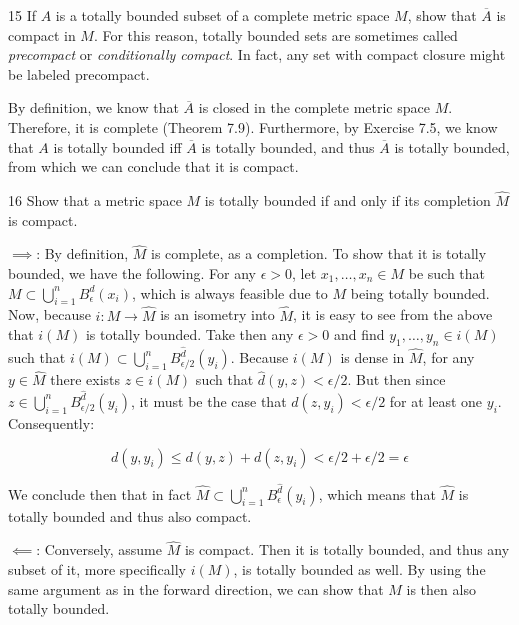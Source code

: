 \begin{exercise}{15}
    If $A$ is a totally bounded subset of a complete metric space $M$, show that $\overline{A}$ is compact in $M$.
    For this reason, totally bounded sets are sometimes called \textit{precompact} or \textit{conditionally compact}.
    In fact, any set with compact closure might be labeled precompact.
\end{exercise}

\begin{solution}
    
    By definition, we know that $\overline{A}$ is closed in the complete metric space $M$.
    Therefore, it is complete (Theorem 7.9).
    Furthermore, by Exercise 7.5, we know that $A$ is totally bounded iff $\overline{A}$ is totally bounded, and thus $\overline{A}$ is totally bounded, from which we can conclude that it is compact.
\end{solution}

\begin{exercise}{16}
    Show that a metric space $M$ is totally bounded if and only if its completion $\hat{M}$ is compact.
\end{exercise}

\begin{solution}

    $\implies$: By definition, $\hat{M}$ is complete, as a completion.
    To show that it is totally bounded, we have the following.
    For any $\epsilon > 0$, let $x_1, \ldots, x_n \in M$ be such that $M \subset \bigcup_{i=1}^{n} B_{\epsilon}^{d}(x_i)$, which is always feasible due to $M$ being totally bounded.
    Now, because $i:M \rightarrow \hat{M}$ is an isometry into $\hat{M}$, it is easy to see from the above that $i(M)$ is totally bounded.
    Take then any $\epsilon > 0$ and find $y_1, \ldots, y_n \in i(M)$ such that $i(M) \subset \bigcup_{i=1}^{n} B_{\epsilon/2}^{\hat{d}} (y_i)$.
    Because $i(M)$ is dense in $\hat{M}$, for any $y \in \hat{M}$ there exists $z \in i(M)$ such that $\hat{d}(y, z) < \epsilon/2$.
    But then since $z \in \bigcup_{i=1}^{n} B_{\epsilon/2}^{\hat{d}} (y_i)$, it must be the case that $d(z, y_i) < \epsilon/2$ for at least one $y_i$.
    Consequently:

    \[d(y, y_i) \leq d(y, z) + d(z, y_i) < \epsilon/2 + \epsilon/2 = \epsilon\]

    We conclude then that in fact $\hat{M} \subset \bigcup_{i=1}^{n} B_{\epsilon}^{\hat{d}} (y_i)$, which means that $\hat{M}$ is totally bounded and thus also compact.

    $\impliedby$: Conversely, assume $\hat{M}$ is compact.
    Then it is totally bounded, and thus any subset of it, more specifically $i(M)$, is totally bounded as well.
    By using the same argument as in the forward direction, we can show that $M$ is then also totally bounded.
\end{solution}

